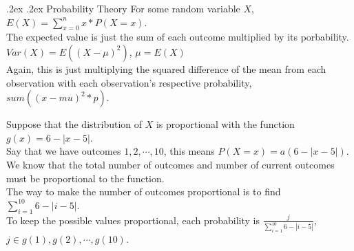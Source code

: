\documentclass[10pt,landscape]{article}
\makeatletter
\renewcommand{\subsection}{\@startsection{subsection}{2}{0mm}%
                                {.2ex}%
                                {.2ex}%
                                {\normalfont\normalsize\bfseries}}
\makeatother
\begin{document}
\begin{multicols}{3}
\subsection{Probability Theory}
For some random variable $X$, $E(X) = \sum_{x = 0}^{n} x * P(X = x)$. \\
The expected value is just the sum of each outcome multiplied by its porbability. \\
$Var(X) = E((X - \mu) ^ 2)$, $\mu = E(X)$ \\
Again, this is just multiplying the squared difference of the mean from each observation with each observation's respective probability, $sum((x-mu)^2*p)$.

Suppose that the distribution of $X$ is proportional with the function $g(x) = 6 - |x - 5|$. \\
Say that we have outcomes $1, 2, \cdots, 10$, this means $P(X = x) = a(6 - |x - 5|)$. \\
We know that the total number of outcomes and number of current outcomes must be proportional to the function. \\
The way to make the number of outcomes proportional is to find $\sum_{i = 1}^{10}6 - |i - 5|$. \\
To keep the possible values proportional, each probability is $\frac{j}{\sum_{i = 1}^{10}6 - |i - 5|}$, $j \in {g(1), g(2), \cdots, g(10)}$.


\end{multicols}
\end{document}
